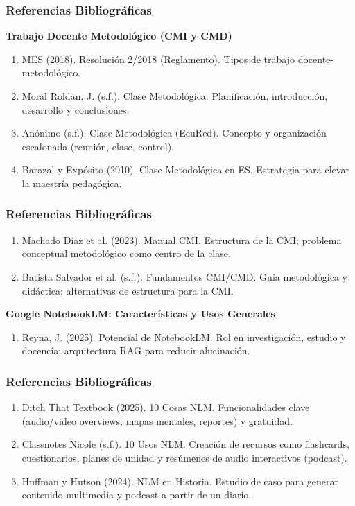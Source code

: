 \documentclass[aspectratio=43]{beamer}
\begin{document}
\begin{frame}
  \frametitle{ Referencias Bibliográficas}
  
  \textbf{Trabajo Docente Metodológico (CMI y CMD)}
  \begin{enumerate}
      \item MES (2018). Resolución 2/2018 (Reglamento). Tipos de trabajo docente-metodológico.
      \item Moral Roldan, J. (s.f.). Clase Metodológica. Planificación, introducción, desarrollo y conclusiones.
      \item Anónimo (s.f.). Clase Metodológica (EcuRed). Concepto y organización escalonada (reunión, clase, control).
      \item Barazal y Expósito (2010). Clase Metodológica en ES. Estrategia para elevar la maestría pedagógica.
  \end{enumerate}
\end{frame}

\begin{frame}
  \frametitle{ Referencias Bibliográficas}
  \begin{enumerate}
      \item Machado Díaz et al. (2023). Manual CMI. Estructura de la CMI; problema conceptual metodológico como centro de la clase.
      \item Batista Salvador et al. (s.f.). Fundamentos CMI/CMD. Guía metodológica y didáctica; alternativas de estructura para la CMI.
  \end{enumerate}
  
  \textbf{Google NotebookLM: Características y Usos Generales}
  \begin{enumerate}    
    \item Reyna, J. (2025). Potencial de NotebookLM. Rol en investigación, estudio y docencia; arquitectura RAG para reducir alucinación.
  \end{enumerate}
\end{frame}

\begin{frame}
  \frametitle{ Referencias Bibliográficas}

  \begin{enumerate}    
    \item Ditch That Textbook (2025). 10 Cosas NLM. Funcionalidades clave (audio/video overviews, mapas mentales, reportes) y gratuidad.
    \item Classnotes Nicole (s.f.). 10 Usos NLM. Creación de recursos como flashcards, cuestionarios, planes de unidad y resúmenes de audio interactivos (podcast).
    \item Huffman y Hutson (2024). NLM en Historia. Estudio de caso para generar contenido multimedia y podcast a partir de un diario.
  \end{enumerate}
\end{frame}
\end{document}
